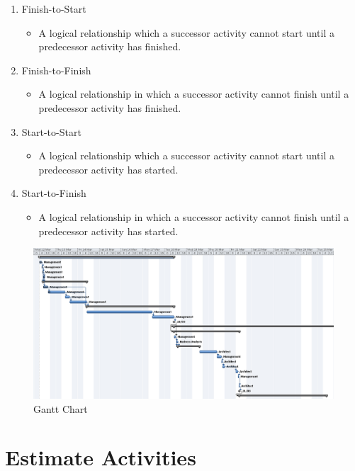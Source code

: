 \begin{enumerate}
\item Finish-to-Start
\begin{itemize}
\item A logical relationship which a successor activity cannot start until a predecessor activity has finished.
\end{itemize}
\item Finish-to-Finish
\begin{itemize}
\item A logical relationship in which a successor activity cannot finish until a predecessor activity has finished.
\end{itemize}
\item Start-to-Start
\begin{itemize}
\item A logical relationship which a successor activity cannot start until a predecessor activity has started.
\end{itemize}
\item Start-to-Finish
\begin{itemize}
\item A logical relationship in which a successor activity cannot finish until a predecessor activity has started.
\end{itemize}
\end{enumerate}

\begin{figure}[H]
\begin{center}
\includegraphics[width=13cm]{wbs2.png}
\end{center}
\caption{Gantt Chart }
\label{fig:letter}
\end{figure}

\section{Estimate Activities}

